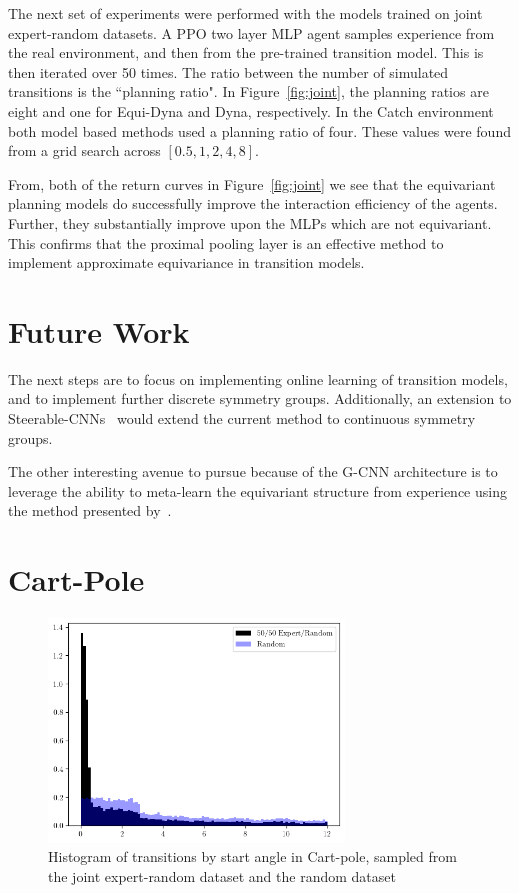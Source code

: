 \documentclass[mlabstract]{jmlr}
\begin{document}
The next set of experiments were performed with the models trained on joint expert-random datasets. A PPO two layer MLP agent samples experience from the real environment, and then from the pre-trained transition model. This is then iterated over 50 times. The ratio between the number of simulated transitions is the ``planning ratio". In Figure~\ref{fig:joint}, the planning ratios are eight and one for Equi-Dyna and Dyna, respectively. In the Catch environment both model based methods used a planning ratio of four. These values were found from a grid search across $[0.5, 1, 2, 4,  8]$.

From, both of the return curves in Figure~\ref{fig:joint} we see that the equivariant planning models do successfully improve the interaction efficiency of the agents. Further, they substantially improve upon the MLPs which are not equivariant. This confirms that the proximal pooling layer is an effective method to implement approximate equivariance in transition models.

\vspace{-10}
\section{Future Work}
The next steps are to focus on implementing online learning of transition models, and to implement further discrete symmetry groups. Additionally, an extension to Steerable-CNNs~\cite{weiler2019general} would extend the current method to continuous symmetry groups.

The other interesting avenue to pursue because of the G-CNN architecture is to leverage the ability to meta-learn the equivariant structure from experience using the method presented by~\cite{zhou2020meta}.

\newpage



\appendix
\section{Cart-Pole}
\begin{figure}[h]
	\centering
	\includegraphics[width=0.7\textwidth]{Figures/angles_cp.png}
	\caption{Histogram of transitions by start angle in Cart-pole, sampled from the joint expert-random dataset and the random dataset}\label{fig:cp_hist}
\end{figure}
\end{document}
